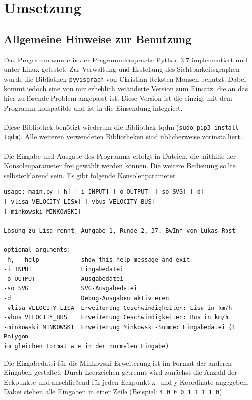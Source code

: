\documentclass[a4paper, notitlepage, 12pt]{scrartcl}
\begin{document}
\section{Umsetzung}
\subsection{Allgemeine Hinweise zur Benutzung}
Das Programm wurde in der Programmiersprache Python 3.7 implementiert und unter Linux getestet. Zur Verwaltung und Erstellung des Sichtbarkeitsgraphen wurde die Bibliothek \texttt{pyvisgraph} von Christian Reksten-Monsen benutzt. Dabei kommt jedoch eine von mir erheblich veränderte Version zum Einsatz, die an das hier zu lösende Problem angepasst ist. Diese Version ist die einzige mit dem Programm kompatible und ist in die Einsendung integriert. \\ \\ Diese Bibliothek benötigt wiederum die Bibliothek tqdm (\texttt{sudo pip3 install tqdm}). Alle weiteren verwendeten Bibliotheken sind üblicherweise vorinstalliert. \\ \\
Die Eingabe und Ausgabe des Programms erfolgt in Dateien, die mithilfe der Konsolenparameter frei gewählt werden können. Die weitere Bedienung sollte selbsterklärend sein. Es gibt folgende Konsolenparameter:
\begin{verbatim}
usage: main.py [-h] [-i INPUT] [-o OUTPUT] [-so SVG] [-d]
[-vlisa VELOCITY_LISA] [-vbus VELOCITY_BUS]
[-minkowski MINKOWSKI]

Lösung zu Lisa rennt, Aufgabe 1, Runde 2, 37. BwInf von Lukas Rost

optional arguments:
-h, --help            show this help message and exit
-i INPUT              Eingabedatei
-o OUTPUT             Ausgabedatei
-so SVG               SVG-Ausgabedatei
-d                    Debug-Ausgaben aktivieren
-vlisa VELOCITY_LISA  Erweiterung Geschwindigkeiten: Lisa in km/h
-vbus VELOCITY_BUS    Erweiterung Geschwindigkeiten: Bus in km/h
-minkowski MINKOWSKI  Erweiterung Minkowski-Summe: Eingabedatei (1 Polygon
im gleichen Format wie in der normalen Eingabe)
\end{verbatim}
Die Eingabedatei für die Minkowski-Erweiterung ist im Format der anderen Eingaben gestaltet. Durch Leerzeichen getrennt wird zunächst die Anzahl der Eckpunkte und anschließend für jeden Eckpunkt x- und y-Koordinate angegeben. Dabei stehen alle Eingaben in einer Zeile (Beispiel: \texttt{4 0 0 0 1 1 1 1 0}).
\end{document}
